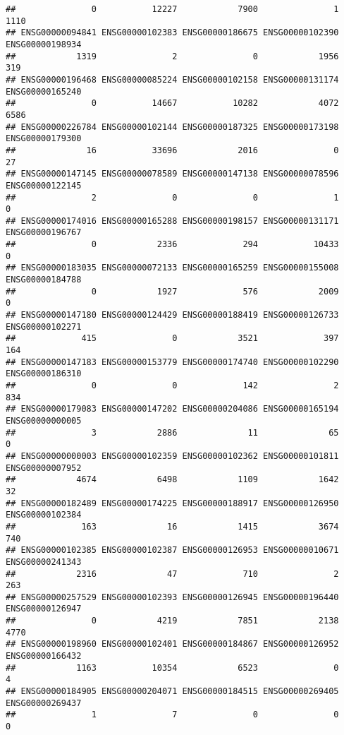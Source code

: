 \documentclass[
]{article}
\begin{document}
\begin{verbatim}
##               0           12227            7900               1            1110 
## ENSG00000094841 ENSG00000102383 ENSG00000186675 ENSG00000102390 ENSG00000198934 
##            1319               2               0            1956             319 
## ENSG00000196468 ENSG00000085224 ENSG00000102158 ENSG00000131174 ENSG00000165240 
##               0           14667           10282            4072            6586 
## ENSG00000226784 ENSG00000102144 ENSG00000187325 ENSG00000173198 ENSG00000179300 
##              16           33696            2016               0              27 
## ENSG00000147145 ENSG00000078589 ENSG00000147138 ENSG00000078596 ENSG00000122145 
##               2               0               0               1               0 
## ENSG00000174016 ENSG00000165288 ENSG00000198157 ENSG00000131171 ENSG00000196767 
##               0            2336             294           10433               0 
## ENSG00000183035 ENSG00000072133 ENSG00000165259 ENSG00000155008 ENSG00000184788 
##               0            1927             576            2009               0 
## ENSG00000147180 ENSG00000124429 ENSG00000188419 ENSG00000126733 ENSG00000102271 
##             415               0            3521             397             164 
## ENSG00000147183 ENSG00000153779 ENSG00000174740 ENSG00000102290 ENSG00000186310 
##               0               0             142               2             834 
## ENSG00000179083 ENSG00000147202 ENSG00000204086 ENSG00000165194 ENSG00000000005 
##               3            2886              11              65               0 
## ENSG00000000003 ENSG00000102359 ENSG00000102362 ENSG00000101811 ENSG00000007952 
##            4674            6498            1109            1642              32 
## ENSG00000182489 ENSG00000174225 ENSG00000188917 ENSG00000126950 ENSG00000102384 
##             163              16            1415            3674             740 
## ENSG00000102385 ENSG00000102387 ENSG00000126953 ENSG00000010671 ENSG00000241343 
##            2316              47             710               2             263 
## ENSG00000257529 ENSG00000102393 ENSG00000126945 ENSG00000196440 ENSG00000126947 
##               0            4219            7851            2138            4770 
## ENSG00000198960 ENSG00000102401 ENSG00000184867 ENSG00000126952 ENSG00000166432 
##            1163           10354            6523               0               4 
## ENSG00000184905 ENSG00000204071 ENSG00000184515 ENSG00000269405 ENSG00000269437 
##               1               7               0               0               0 

\end{verbatim}
\end{document}
